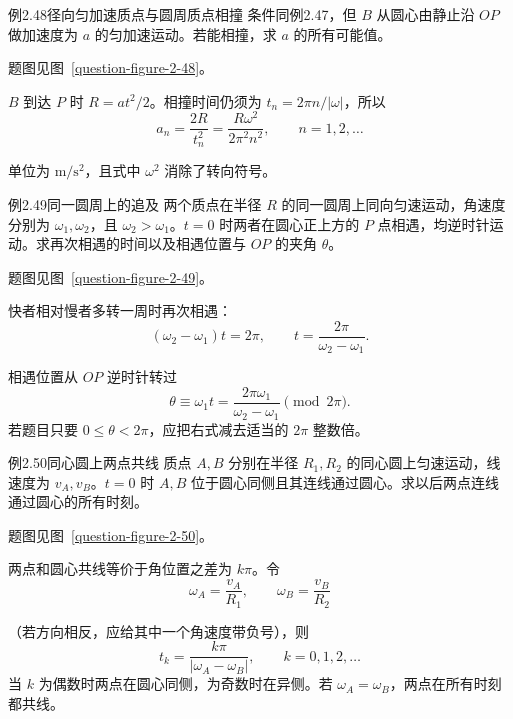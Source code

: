 \begin{origexamplebox}{例2.48\quad 径向匀加速质点与圆周质点相撞}
条件同例2.47，但 $B$ 从圆心由静止沿 $OP$ 做加速度为 $a$ 的匀加速运动。若能相撞，求 $a$ 的所有可能值。
\par 题图见图~\ref{question-figure-2-48}。
\KQuestionBW
\end{origexamplebox}
\begin{xesolution}
$B$ 到达 $P$ 时 $R=at^2/2$。相撞时间仍须为 $t_n=2\pi n/|\omega|$，所以
\[
 \boxed{a_n=\frac{2R}{t_n^2}=\frac{R\omega^2}{2\pi^2n^2}},
 \qquad n=1,2,\ldots
\]
\RadialAcceleratedCollisionDiagram

单位为 $\mathrm{m/s^2}$，且式中 $\omega^2$ 消除了转向符号。
\end{xesolution}

\begin{origexamplebox}{例2.49\quad 同一圆周上的追及}
两个质点在半径 $R$ 的同一圆周上同向匀速运动，角速度分别为 $\omega_1,\omega_2$，且 $\omega_2>\omega_1$。$t=0$ 时两者在圆心正上方的 $P$ 点相遇，均逆时针运动。求再次相遇的时间以及相遇位置与 $OP$ 的夹角 $\theta$。
\par 题图见图~\ref{question-figure-2-49}。
\KQuestionBX
\end{origexamplebox}
\begin{xesolution}
快者相对慢者多转一周时再次相遇：
\[
 (\omega_2-\omega_1)t=2\pi,
 \qquad
 \boxed{t=\frac{2\pi}{\omega_2-\omega_1}}.
\]
\SameCirclePursuitDiagram

相遇位置从 $OP$ 逆时针转过
\[
 \boxed{\theta\equiv\omega_1t
 =\frac{2\pi\omega_1}{\omega_2-\omega_1}\pmod{2\pi}}.
\]
若题目只要 $0\le\theta<2\pi$，应把右式减去适当的 $2\pi$ 整数倍。
\end{xesolution}

\begin{origexamplebox}{例2.50\quad 同心圆上两点共线}
质点 $A,B$ 分别在半径 $R_1,R_2$ 的同心圆上匀速运动，线速度为 $v_A,v_B$。$t=0$ 时 $A,B$ 位于圆心同侧且其连线通过圆心。求以后两点连线通过圆心的所有时刻。
\par 题图见图~\ref{question-figure-2-50}。
\KQuestionBY
\end{origexamplebox}
\begin{xesolution}
两点和圆心共线等价于角位置之差为 $k\pi$。令
\[
\omega_A=\frac{v_A}{R_1},\qquad \omega_B=\frac{v_B}{R_2}
\]
\ConcentricCollinearityDiagram

（若方向相反，应给其中一个角速度带负号），则
\[
 \boxed{t_k=\frac{k\pi}{|\omega_A-\omega_B|}},\qquad k=0,1,2,\ldots
\]
当 $k$ 为偶数时两点在圆心同侧，为奇数时在异侧。若 $\omega_A=\omega_B$，两点在所有时刻都共线。
\end{xesolution}

